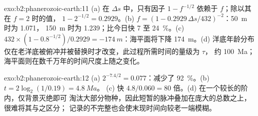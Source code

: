 \begin{solution}{exo:b2:phanerozoic-earth:11}
(a) 在 $\Delta s$ 中，只有因子 $1 - f^{-1/2}$ 依赖于 $f$；除以其在 $f = 2$ 时的值，
$1 - 2^{-1/2} = 0.2929$。(b) $f = (1 - 0.2929\,\Delta s/432)^{-2}$：\qty{50}{m} 时为 1.071，
\qty{150}{m} 时为 1.239；比今日快 7 至 \qty{24}{\percent}。(c) $432 \times (1 -
0.8^{-1/2})/0.2929 = \qty{-174}{m}$：海平面将下降 \qty{174}{m}。(d) 洋底年龄分布
仅在老洋底被俯冲并被替换时才改变，此过程所需时间的量级为 $\tau$，
约 \qty{100}{Ma}；海平面则在数千万年的时间尺度上随之变化。
\end{solution}

\begin{solution}{exo:b2:phanerozoic-earth:12}
(a) $2^{-7.4/2} = 0.077$：减少了 \qty{92}{\percent}。(b) $t = 2\log_2(1/0.19) = \qty{4.8}{Ma}$。
(c) 快 $4.8/0.060 = 80$ 倍。(d) 在一个较长的阶内，仅背景灭绝即可
淘汰大部分物种，因此短暂的脉冲叠加在庞大的总数之上，很难将其与之区分；
记录的不完整也会使末现时间向较老一端模糊。
\end{solution}

